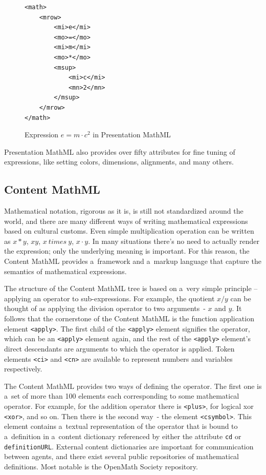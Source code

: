 \documentclass[11pt,oneside,final]{fithesis2}
\def\s#1{#1\index{#1}}
\begin{document}
\begin{figure}[!ht]
\lstset{language=XML,frame=lines}
\begin{lstlisting}
<math>
	<mrow>
		<mi>e</mi>
		<mo>=</mo>
		<mi>m</mi>
		<mo>*</mo>
		<msup>
			<mi>c</mi>
			<mn>2</mn>
		</msup>
	</mrow>
</math>
\end{lstlisting}
\caption{Expression $e=m \cdot c^2$ in Presentation MathML}
\label{fig:presentationmathml}
\end{figure}

Presentation MathML also provides over fifty attributes for fine tuning of expressions, like setting colors, dimensions, alignments, and many others.

\subsection{Content MathML}
Mathematical notation, rigorous as it is, is still not standardized around the world, and there are many different ways of writing mathematical expressions based on cultural customs. Even simple multiplication operation can be written as $x*y$, $xy$, $x\ times\ y$, $x \cdot y$. In many situations there's no need to actually render the expression; only the underlying meaning is important. For this reason, the \s{Content MathML} provides a~framework and a~markup language that capture the semantics of mathematical expressions.

The structure of the Content MathML tree is based on a~very simple principle – applying an operator to sub-expressions. For example, the quotient $x/y$ can be thought of as applying the division operator to two arguments~- $x$ and $y$. It follows that the cornerstone of the Content MathML is the function application element \texttt{<apply>}.  The first child of the \texttt{<apply>} element signifies the operator, which can be an \texttt{<apply>} element again, and the rest of the \texttt{<apply>} element's direct descendants are arguments to which the operator is applied. Token elements \texttt{<ci>} and \texttt{<cn>} are available to represent numbers and variables respectively. 

The Content MathML provides two ways of defining the operator. The first one is a~set of more than 100 elements each corresponding to some mathematical operator. For example, for the addition operator there is \texttt{<plus>}, for logical xor \texttt{<xor>}, and so on. Then there is the second way~- the element \texttt{<csymbol>}. This element contains a~textual representation of the operator that is bound to a~definition in a~\s{content dictionary} referenced by either the attribute \texttt{cd} or \texttt{definitionURL}. External content dictionaries are important for communication between agents, and there exist several public repositories of mathematical definitions. Most notable is the \s{OpenMath} Society repository.
\end{document}
